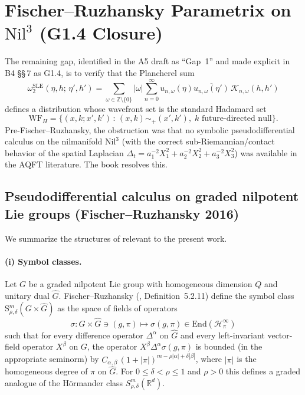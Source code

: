 \documentclass[11pt, a4paper]{article}
\newcommand{\RR}{\mathbb{R}}
\newcommand{\ZZ}{\mathbb{Z}}
\newcommand{\Nil}{\mathrm{Nil}^3}
\newcommand{\WF}{\mathrm{WF}}
\newcommand{\om}{\omega}
\newcommand{\Sym}{\mathrm{S}}
\begin{document}
\section{Fischer--Ruzhansky Parametrix on $\Nil$ (G1.4 Closure)}
\label{sec:FR}

The remaining gap, identified in the A5 draft as ``Gap~1'' and made explicit in
B4 \S\S\,7 as G1.4, is to verify that the Plancherel sum
\begin{equation}\label{eq:2pt_BII}
  \omega_2^{\mathrm{SLE}}(\eta,h;\,\eta',h')
  = \sum_{\om\in\ZZ\setminus\{0\}}|\om|\sum_{n=0}^\infty
    u_{n,\om}(\eta)\overline{u_{n,\om}(\eta')}\,\mathcal{K}_{n,\om}(h,h')
\end{equation}
defines a distribution whose wavefront set is the standard Hadamard set
\begin{equation}
  \WF_H = \{(x,k;x',k')\,:\,(x,k)\sim_+(x',k'),\;k\text{ future-directed null}\}.
\end{equation}
Pre-Fischer--Ruzhansky, the obstruction was that no symbolic
pseudodifferential calculus on the nilmanifold $\Nil$ (with the correct
sub-Riemannian/contact behavior of the spatial Laplacian
$\Delta_t = a_1^{-2}X_1^2 + a_2^{-2}X_2^2 + a_3^{-2}X_3^2$) was available
in the AQFT literature. The book \cite{FR16} resolves this.

\subsection{Pseudodifferential calculus on graded nilpotent Lie groups
(Fischer--Ruzhansky 2016)}\label{sec:FR_overview}

We summarize the structures of \cite{FR16} relevant to the present work.

\paragraph{(i) Symbol classes.}
Let $G$ be a graded nilpotent Lie group with homogeneous dimension $Q$ and
unitary dual $\widehat G$. Fischer--Ruzhansky (\cite{FR16}, Definition~5.2.11)
define the symbol class $\Sym^m_{\rho,\delta}(G\times\widehat G)$ as the space
of fields of operators
\begin{equation}
  \sigma:G\times\widehat G\ni(g,\pi)\longmapsto\sigma(g,\pi)\in
  \mathrm{End}(\mathcal H_\pi^\infty)
\end{equation}
such that for every difference operator $\Delta^\alpha$ on $\widehat G$ and
every left-invariant vector-field operator $X^\beta$ on $G$, the operator
$X^\beta\Delta^\alpha\sigma(g,\pi)$ is bounded (in the appropriate
seminorm) by $C_{\alpha,\beta}\,(1+|\pi|)^{m-\rho|\alpha|+\delta|\beta|}$,
where $|\pi|$ is the homogeneous degree of $\pi$ on $\widehat G$.
For $0\le\delta<\rho\le1$ and $\rho>0$ this defines a graded analogue of
the Hörmander class $S^m_{\rho,\delta}(\RR^d)$.
\end{document}

